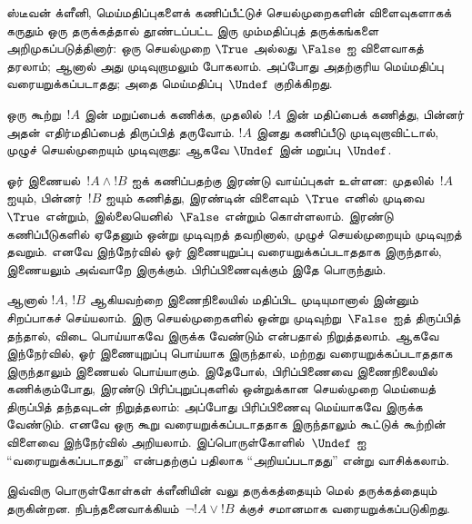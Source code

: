 \documentclass[../../../include/open-logic-section]{subfiles}
\begin{document}


ஸ்டீவன் க்ளீனி, மெய்மதிப்புகளைக் கணிப்பீட்டுச் செயல்முறைகளின் விளைவுகளாகக்
கருதும் ஒரு தருக்கத்தால் தூண்டப்பட்ட இரு மும்மதிப்புத் தருக்கங்களை
அறிமுகப்படுத்தினார்: ஒரு செயல்முறை $\True$ அல்லது $\False$ ஐ விளைவாகத்
தரலாம்; ஆனால் அது முடிவுறாமலும் போகலாம். அப்போது அதற்குரிய மெய்மதிப்பு
வரையறுக்கப்படாதது; அதை மெய்மதிப்பு~$\Undef$ குறிக்கிறது.

ஒரு கூற்று~$!A$ இன் மறுப்பைக் கணிக்க, முதலில்~$!A$ இன் மதிப்பைக் கணித்து,
பின்னர் அதன் எதிர்மதிப்பைத் திருப்பித் தருவோம். $!A$ இனது கணிப்பீடு
முடிவுறாவிட்டால், முழுச் செயல்முறையும் முடிவுறாது: ஆகவே $\Undef$ இன்
மறுப்பு~$\Undef$.

ஓர் இணையல்~$!A \land !B$ ஐக் கணிப்பதற்கு இரண்டு வாய்ப்புகள் உள்ளன:
முதலில்~$!A$ ஐயும், பின்னர்~$!B$ ஐயும் கணித்து, இரண்டின் விளைவும்~$\True$
எனில் முடிவை~$\True$ என்றும், இல்லையெனில்~$\False$ என்றும் கொள்ளலாம்.
இரண்டு கணிப்பீடுகளில் ஏதேனும் ஒன்று முடிவுறத் தவறினால், முழுச்
செயல்முறையும் முடிவுறத் தவறும். எனவே இந்நேர்வில் ஓர் இணையுறுப்பு
வரையறுக்கப்படாததாக இருந்தால், இணையலும் அவ்வாறே இருக்கும். பிரிப்பிணைவுக்கும்
இதே பொருந்தும்.

ஆனால் $!A$, $!B$ ஆகியவற்றை இணைநிலையில் மதிப்பிட முடியுமானால் இன்னும்
சிறப்பாகச் செய்யலாம். இரு செயல்முறைகளில் ஒன்று முடிவுற்று~$\False$ ஐத்
திருப்பித் தந்தால், விடை பொய்யாகவே இருக்க வேண்டும் என்பதால் நிறுத்தலாம்.
ஆகவே இந்நேர்வில், ஓர் இணையுறுப்பு பொய்யாக இருந்தால், மற்றது
வரையறுக்கப்படாததாக இருந்தாலும் இணையல் பொய்யாகும். இதேபோல், பிரிப்பிணைவை
இணைநிலையில் கணிக்கும்போது, இரண்டு பிரிப்புறுப்புகளில் ஒன்றுக்கான செயல்முறை
மெய்யைத் திருப்பித் தந்தவுடன் நிறுத்தலாம்: அப்போது பிரிப்பிணைவு மெய்யாகவே
இருக்க வேண்டும். எனவே ஒரு கூறு வரையறுக்கப்படாததாக இருந்தாலும் கூட்டுக்
கூற்றின் விளைவை இந்நேர்வில் அறியலாம். இப்பொருள்கோளில்~$\Undef$ ஐ
``வரையறுக்கப்படாதது'' என்பதற்குப் பதிலாக ``அறியப்படாதது'' என்று வாசிக்கலாம்.

இவ்விரு பொருள்கோள்கள் க்ளீனியின் வலு தருக்கத்தையும் மெல் தருக்கத்தையும்
தருகின்றன. நிபந்தனைவாக்கியம்~$\lnot !A \lor !B$ க்குச் சமானமாக
வரையறுக்கப்படுகிறது.
\end{document}
